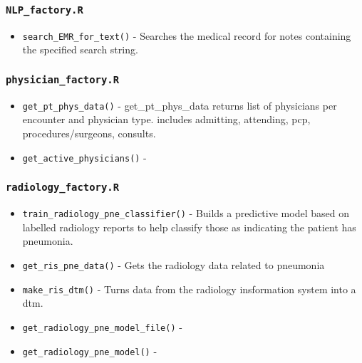 \documentclass[
]{book}
\providecommand{\tightlist}{%
  \setlength{\itemsep}{0pt}\setlength{\parskip}{0pt}}
\begin{document}
\hypertarget{nlp_factory.r}{%
\subsubsection{\texorpdfstring{\texttt{NLP\_factory.R}}{NLP\_factory.R}}\label{nlp_factory.r}}

\begin{itemize}
\tightlist
\item
  \texttt{search\_EMR\_for\_text()} - Searches the medical record for notes containing the specified search string.
\end{itemize}

\hypertarget{physician_factory.r}{%
\subsubsection{\texorpdfstring{\texttt{physician\_factory.R}}{physician\_factory.R}}\label{physician_factory.r}}

\begin{itemize}
\tightlist
\item
  \texttt{get\_pt\_phys\_data()} - get\_pt\_phys\_data returns list of physicians per encounter and physician type. includes admitting, attending, pcp, procedures/surgeons, consults.
\item
  \texttt{get\_active\_physicians()} -
\end{itemize}

\hypertarget{radiology_factory.r}{%
\subsubsection{\texorpdfstring{\texttt{radiology\_factory.R}}{radiology\_factory.R}}\label{radiology_factory.r}}

\begin{itemize}
\tightlist
\item
  \texttt{train\_radiology\_pne\_classifier()} - Builds a predictive model based on labelled radiology reports to help classify those as indicating the patient has pneumonia.
\item
  \texttt{get\_ris\_pne\_data()} - Gets the radiology data related to pneumonia
\item
  \texttt{make\_ris\_dtm()} - Turns data from the radiology insformation system into a dtm.
\item
  \texttt{get\_radiology\_pne\_model\_file()} -
\item
  \texttt{get\_radiology\_pne\_model()} -
\end{itemize}
\end{document}
